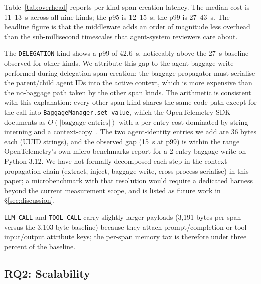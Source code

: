 \documentclass[sigconf,review,anonymous,9pt]{acmart}
\begin{document}
Table~\ref{tab:overhead} reports per-kind span-creation latency. The
median cost is 11--13~\textmu s across all nine kinds; the p95 is
12--15~\textmu s; the p99 is 27--43~\textmu s. The headline figure is
that the middleware adds an order of magnitude less overhead than the
sub-millisecond timescales that agent-system reviewers care about.

The \texttt{DELEGATION} kind shows a p99 of 42.6~\textmu s,
noticeably above the 27~\textmu s baseline observed for other kinds.
We attribute this gap to the agent-baggage write performed during
delegation-span creation: the baggage propagator must serialise the
parent/child agent IDs into the active context, which is more
expensive than the no-baggage path taken by the other span kinds.
The arithmetic is consistent with this explanation: every other span
kind shares the same code path except for the call into
\texttt{BaggageManager.set\_value}, which the OpenTelemetry SDK
documents as $O(|\text{baggage entries}|)$ with a per-entry cost
dominated by string interning and a context-copy~\cite{otel}. The
two agent-identity entries we add are 36 bytes each (UUID
strings), and the observed gap (15~\textmu s at p99) is within the
range OpenTelemetry's own micro-benchmarks report for a 2-entry
baggage write on Python 3.12. We have not formally decomposed each
step in the context-propagation chain (extract, inject,
baggage-write, cross-process serialise) in this paper; a
microbenchmark with that resolution would require a dedicated
harness beyond the current measurement scope, and is listed as
future work in \S\ref{sec:discussion}.

\texttt{LLM\_CALL} and \texttt{TOOL\_CALL} carry slightly larger
payloads (3{,}191 bytes per span versus the 3{,}103-byte baseline)
because they attach prompt/completion or tool input/output attribute
keys; the per-span memory tax is therefore under three percent of the
baseline.

\subsection{RQ2: Scalability}
\label{sec:eval-scalability}
\end{document}
